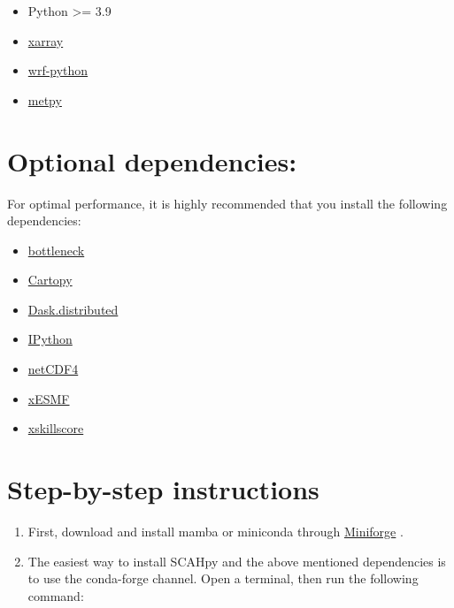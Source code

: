 \documentclass[
  letterpaper,
  DIV=11,
  numbers=noendperiod]{scrreprt}
\providecommand{\tightlist}{%
  \setlength{\itemsep}{0pt}\setlength{\parskip}{0pt}}\usepackage{longtable,booktabs,array}
\begin{document}

\begin{itemize}
\tightlist
\item
  Python \textgreater= 3.9
\item
  \href{http://xarray.pydata.org/}{xarray}
\item
  \href{https://github.com/NCAR/wrf-python}{wrf-python}
\item
  \href{https://github.com/Unidata/MetPy}{metpy}
\end{itemize}

\hypertarget{optional-dependencies}{%
\section*{Optional dependencies:}\label{optional-dependencies}}


For optimal performance, it is highly recommended that you install the
following dependencies:

\begin{itemize}
\tightlist
\item
  \href{https://github.com/kwgoodman/bottleneck}{bottleneck}
\item
  \href{https://scitools.org.uk/cartopy}{Cartopy}
\item
  \href{http://distributed.dask.org/}{Dask.distributed}
\item
  \href{https://ipython.org/}{IPython}
\item
  \href{https://unidata.github.io/netcdf4-python}{netCDF4}
\item
  \href{https://xesmf.readthedocs.io/}{xESMF}
\item
  \href{https://github.com/xarray-contrib/xskillscore/tree/stable}{xskillscore}
\end{itemize}

\hypertarget{step-by-step-instructions}{%
\section*{Step-by-step instructions}\label{step-by-step-instructions}}


\begin{enumerate}
\def\labelenumi{\arabic{enumi}.}
\item
  First, download and install mamba or miniconda through
  \href{https://github.com/conda-forge/miniforge}{Miniforge} .
\item
  The easiest way to install SCAHpy and the above mentioned dependencies
  is to use the conda-forge channel. Open a terminal, then run the
  following command:
\end{enumerate}
\end{document}
